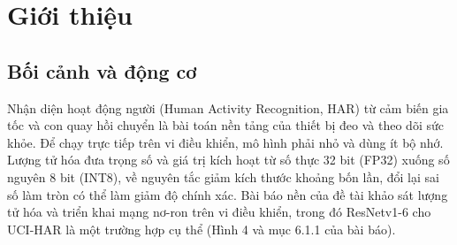 \documentclass[12pt,a4paper]{article}
\begin{document}
\begin{abstract}
\noindent Báo cáo khảo sát ảnh hưởng của lượng tử hóa sau huấn luyện (PTQ) INT8 đến độ chính xác và dung lượng của mô hình nhận diện hoạt động người từ cảm biến quán tính trên bộ dữ liệu UCI-HAR. Nhóm huấn luyện baseline FP32 theo kiến trúc ResNetv1-6 một chiều ($\ParamCount$ tham số), đạt accuracy $\TestAccFP\%$ và macro-F1 $\TestFoneFP$ trên tập test chính thức; sau đó lượng tử hóa full-integer INT8 bằng TensorFlow Lite với ba kích thước calibration (50, 200, 500 cửa sổ) và ba seed, chọn cấu hình bằng validation trước khi mở test. Trên test, INT8 ($n=500$) đạt $\TestAccIntlong \pm \TestAccIntSD\%$, thấp hơn FP32 $\TestDelta$ điểm phần trăm, trong khi file mô hình giảm $\SizeRed\%$ ($\TfliteFP \to \TfliteInt$ byte, $\SizeRatio$ lần). Theo góp ý của giảng viên hướng dẫn, báo cáo trình bày luồng và thuật toán của từng khối bằng công thức, trích xuất toàn bộ tham số (kèm bảng thống kê và giá trị), và cài đặt suy luận bằng C99 thuần, khớp với Keras trên 12 cửa sổ đối chiếu (sai số logits cỡ $10^{-6}$, argmax 12/12). Phạm vi chỉ gồm thí nghiệm trên máy tính; báo cáo không đo RAM, Flash, độ trễ hay năng lượng trên vi điều khiển.
\end{abstract}

\tableofcontents
\clearpage

\section{Giới thiệu}

\subsection{Bối cảnh và động cơ}
Nhận diện hoạt động người (Human Activity Recognition, HAR) từ cảm biến gia tốc và con quay hồi chuyển là bài toán nền tảng của thiết bị đeo và theo dõi sức khỏe. Để chạy trực tiếp trên vi điều khiển, mô hình phải nhỏ và dùng ít bộ nhớ. Lượng tử hóa đưa trọng số và giá trị kích hoạt từ số thực 32 bit (FP32) xuống số nguyên 8 bit (INT8), về nguyên tắc giảm kích thước khoảng bốn lần, đổi lại sai số làm tròn có thể làm giảm độ chính xác. Bài báo nền của đề tài \cite{novac2021} khảo sát lượng tử hóa và triển khai mạng nơ-ron trên vi điều khiển, trong đó ResNetv1-6 cho UCI-HAR là một trường hợp cụ thể (Hình 4 và mục 6.1.1 của bài báo).
\end{document}

